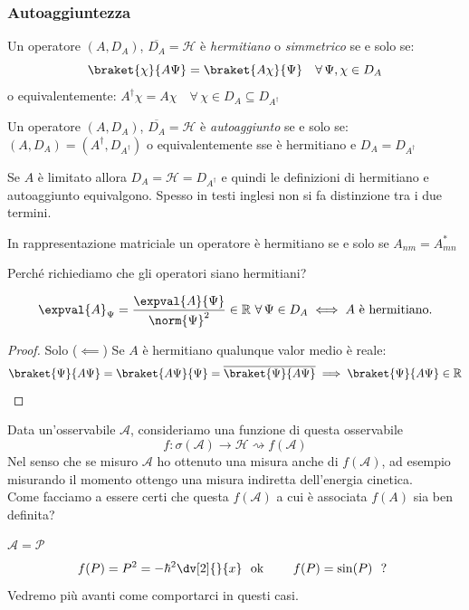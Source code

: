 \subsubsection{Autoaggiuntezza}
\begin{definition}
    Un operatore \((A, D_A)\), \(\overline{D_A}= \mathcal{H}\) è \textit{hermitiano} o \textit{simmetrico} se e solo se:
    \begin{equation}
        \braket{\chi}{A\Psi}   = \braket{A\chi}{\Psi} \quad \forall\, \Psi, \chi \in D_A
    \end{equation}  
    o equivalentemente: \(A^\dagger\chi = A\chi \quad   \forall\,\chi   \in D_A\subseteq D_{A^\dagger}\)
\end{definition}
\begin{definition}
    Un operatore \((A, D_A)\), \(\overline{D_A}= \mathcal{H}\) è \textit{autoaggiunto} se e solo se: \((A, D_A)= (A^\dagger, D_{A^\dagger})\) 
    o equivalentemente sse è hermitiano e \(D_A= D_{A^\dagger}\)
\end{definition}

\begin{remark}
    Se \(A \) è limitato allora \(D_A = \mathcal{H}= D_{A^\dagger}\) e quindi le definizioni di hermitiano e autoaggiunto equivalgono.
    Spesso in testi inglesi non si fa distinzione tra i due termini.
\end{remark}
\begin{remark}
    In rappresentazione matriciale un operatore è hermitiano se e solo se \(A_{nm}= A_{mn}^*\)
\end{remark}

Perché richiediamo che gli operatori siano hermitiani?
\begin{theorem}
    \begin{equation}
        \expval{A}_{\Psi}= \frac{\expval{A}{\Psi}}{\norm{\Psi}^2} \in \mathbb{R} \ \forall\, \Psi \in D_A \iff A \text{ è hermitiano.}
    \end{equation}
\end{theorem}
\begin{proof}
    Solo (\(\impliedby\)) Se \(A\) è hermitiano qualunque valor medio è reale:
    \[
        \braket{\Psi}{A\Psi}= \braket{A\Psi}{\Psi}= \overline{\braket{\Psi}{A\Psi}} \implies \braket{\Psi}{A\Psi} \in \mathbb{R}
    \]
\end{proof}

Data un'osservabile \(\mathcal{A}\), consideriamo una funzione di questa osservabile 
\[ 
f: \sigma(\mathcal{A})\to\mathcal{H}\rightsquigarrow f(\mathcal{A})
\] 
Nel senso che se misuro \(\mathcal{A}\) ho ottenuto una misura anche di \(f(\mathcal{A})\), ad esempio misurando il momento ottengo una misura indiretta dell'energia cinetica.\\
Come facciamo a essere certi che questa \(f(\mathcal{A})\) a cui è associata \(f(A)\) sia ben definita?
\begin{example}\(\mathcal{A} = \mathcal{P}\)
    \[
        f(P) = P^2 = -\hbar^2\dv[2]{}{x} \ \text{ ok } \qquad f(P) = \sin(P) \ \text{ ? }
    \]
    Vedremo più avanti come comportarci in questi casi.
\end{example}

